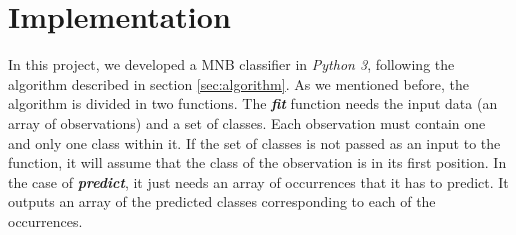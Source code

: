 \section{Implementation}
\label{sec:implementation}

In this project, we developed a MNB classifier in \textit{Python 3}, following the algorithm described in section \ref{sec:algorithm}. As we mentioned before, the algorithm is divided in two functions. The \textbf{\textit{fit}} function needs the input data (an array of observations) and a set of classes. Each observation must contain one and only one class within it. If the set of classes is not passed as an input to the function, it will assume that the class of the observation is in its first position. In the case of \textbf{\textit{predict}}, it just needs an array of occurrences that it has to predict. It outputs an array of the predicted classes corresponding to each of the occurrences.